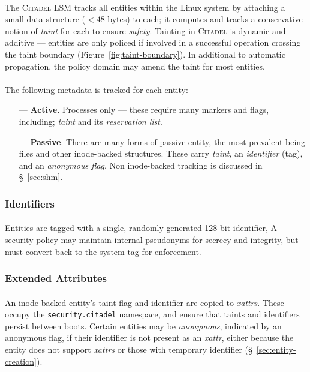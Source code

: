\paragraph{} The \textsc{Citadel} LSM tracks all entities within the Linux system by attaching a small data structure ($<48$ bytes) to each; it computes and tracks a conservative notion of \textit{taint} for each to ensure \textit{safety}. Tainting in \textsc{Citadel} is dynamic and additive --- entities are only policed if involved in a successful operation crossing the taint boundary (Figure~\ref{fig:taint-boundary}). In additional to automatic propagation, the policy domain may amend the taint for most entities.

\paragraph{} The following metadata is tracked for each entity:

\begin{enumerate}
    \item[---]\textbf{Active}. Processes only --- these require many markers and flags, including; \textit{taint} and its \textit{reservation list}.
    \item[---] \textbf{Passive}. There are many forms of passive entity, the most prevalent being files and other inode-backed structures. These carry \textit{taint}, an \textit{identifier} (tag), and an \textit{anonymous flag}. Non inode-backed tracking is discussed in §~\ref{sec:shm}.
\end{enumerate}

\subsubsection{Identifiers}
\paragraph{} Entities are tagged with a single, randomly-generated 128-bit identifier, A security policy may maintain internal pseudonyms for secrecy and integrity, but must convert back to the system tag for enforcement.

\subsubsection{Extended Attributes} 
\paragraph{} An inode-backed entity's taint flag and identifier are copied to \textit{xattrs}. These occupy the \texttt{security.citadel} namespace, and ensure that taints and identifiers persist between boots. Certain entities may be \textit{anonymous}, indicated by an anonymous flag, if their identifier is not present as an \textit{xattr}, either because the entity does not support \textit{xattrs} or those with temporary identifier (§~\ref{sec:entity-creation}).



